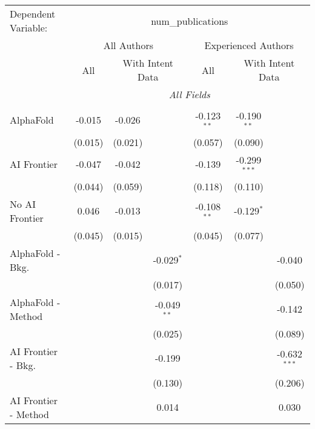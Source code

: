 \begingroup
\centering
\begin{tabular}{lcccccc}
   \tabularnewline \midrule \midrule
   Dependent Variable: & \multicolumn{6}{c}{num\_publications}\\
 & \multicolumn{3}{c}{All Authors} & \multicolumn{3}{c}{Experienced Authors} \\
\cmidrule(lr){2-4} \cmidrule(lr){5-7}
 & \multicolumn{1}{c}{All} & \multicolumn{2}{c}{With Intent Data} & \multicolumn{1}{c}{All} & \multicolumn{2}{c}{With Intent Data} \\
\cmidrule(lr){2-2} \cmidrule(lr){3-4} \cmidrule(lr){5-5} \cmidrule(lr){6-7}
 & \multicolumn{6}{c}{\textit{All Fields}} \\ \\
   AlphaFold               & -0.015    & -0.026  &               & -0.123$^{**}$ & -0.190$^{**}$  &   \\   
                           & (0.015)   & (0.021) &               & (0.057)       & (0.090)        &   \\   
   AI Frontier             & -0.047    & -0.042  &               & -0.139        & -0.299$^{***}$ &   \\   
                           & (0.044)   & (0.059) &               & (0.118)       & (0.110)        &   \\   
   No AI Frontier          & 0.046     & -0.013  &               & -0.108$^{**}$ & -0.129$^{*}$   &   \\   
                           & (0.045)   & (0.015) &               & (0.045)       & (0.077)        &   \\   
   AlphaFold - Bkg.        &           &         & -0.029$^{*}$  &               &                & -0.040\\   
                           &           &         & (0.017)       &               &                & (0.050)\\   
   AlphaFold - Method      &           &         & -0.049$^{**}$ &               &                & -0.142\\   
                           &           &         & (0.025)       &               &                & (0.089)\\   
   AI Frontier - Bkg.      &           &         & -0.199        &               &                & -0.632$^{***}$\\   
                           &           &         & (0.130)       &               &                & (0.206)\\   
   AI Frontier - Method    &           &         & 0.014         &               &                & 0.030\\   

\end{tabular}
